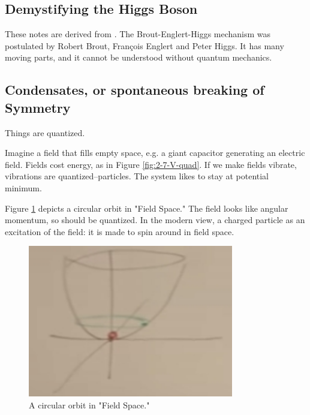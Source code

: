 \documentclass[]{article}
\begin{document}
\begin{appendices}
	\section{Demystifying the Higgs Boson}
	
	These notes are derived from \cite{susskind2010demystifing}.
	The  Brout-Englert-Higgs mechanism was postulated by Robert Brout, Fran\c{c}ois Englert and Peter Higgs. It has many moving parts, and it cannot be understood without quantum mechanics.
	
	\subsection{Condensates, or spontaneous breaking of Symmetry}
	
	Things are quantized.

	Imagine a field that fills empty space, e.g. a giant capacitor generating an electric field. Fields cost energy, as in Figure \ref{fig:2-7-V-quad}. If we make fields vibrate, vibrations are quantized--particles. The system likes to stay at potential minimum.
	
	Figure \ref{fig:2-appendix-field-circle} depicts a circular orbit in "Field Space." The field looks like angular momentum, so should be quantized. In the modern view,  a charged particle as an excitation of the field: it is made to spin around in field space.
	
	\begin{figure}[H]
		\caption{A circular orbit in "Field Space."}\label{fig:2-appendix-field-circle}
		\includegraphics[width=0.8\textwidth]{2-appendix-field-circle}
	\end{figure}
	

\end{appendices}
\end{document}

